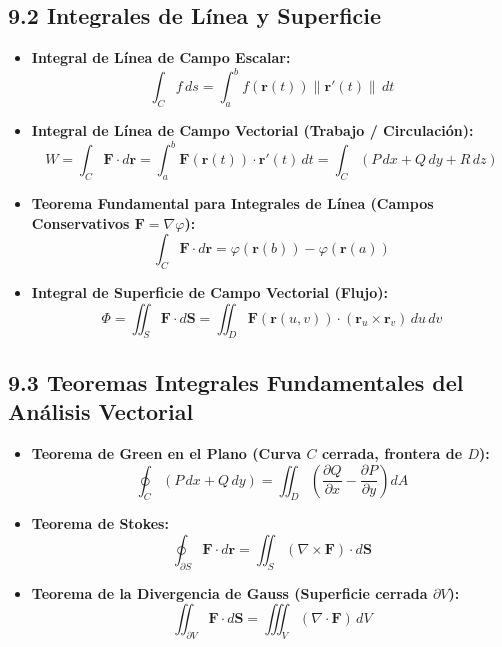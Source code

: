 \documentclass[11pt,a4paper]{article}
\begin{document}
\subsection*{9.2 Integrales de Línea y Superficie}

\begin{itemize}
  \item \textbf{Integral de Línea de Campo Escalar:}
  \[
    \int_C f \, ds = \int_a^b f(\mathbf{r}(t)) \|\mathbf{r}'(t)\| \, dt
  \]
  \item \textbf{Integral de Línea de Campo Vectorial (Trabajo / Circulación):}
  \[
    W = \int_C \mathbf{F} \cdot d\mathbf{r} = \int_a^b \mathbf{F}(\mathbf{r}(t)) \cdot \mathbf{r}'(t) \, dt = \int_C (P \, dx + Q \, dy + R \, dz)
  \]
  \item \textbf{Teorema Fundamental para Integrales de Línea (Campos Conservativos $\mathbf{F} = \nabla\varphi$):}
  \[
    \int_C \mathbf{F} \cdot d\mathbf{r} = \varphi(\mathbf{r}(b)) - \varphi(\mathbf{r}(a))
  \]
  \item \textbf{Integral de Superficie de Campo Vectorial (Flujo):}
  \[
    \Phi = \iint_S \mathbf{F} \cdot d\mathbf{S} = \iint_D \mathbf{F}(\mathbf{r}(u, v)) \cdot (\mathbf{r}_u \times \mathbf{r}_v) \, du \, dv
  \]
\end{itemize}

\subsection*{9.3 Teoremas Integrales Fundamentales del Análisis Vectorial}

\begin{itemize}
  \item \textbf{Teorema de Green en el Plano (Curva $C$ cerrada, frontera de $D$):}
  \[
    \oint_C (P \, dx + Q \, dy) = \iint_D \left(\frac{\partial Q}{\partial x} - \frac{\partial P}{\partial y}\right) dA
  \]
  \item \textbf{Teorema de Stokes:}
  \[
    \oint_{\partial S} \mathbf{F} \cdot d\mathbf{r} = \iint_S (\nabla \times \mathbf{F}) \cdot d\mathbf{S}
  \]
  \item \textbf{Teorema de la Divergencia de Gauss (Superficie cerrada $\partial V$):}
  \[
    \iint_{\partial V} \mathbf{F} \cdot d\mathbf{S} = \iiint_V (\nabla \cdot \mathbf{F}) \, dV
  \]
\end{itemize}
\end{document}
